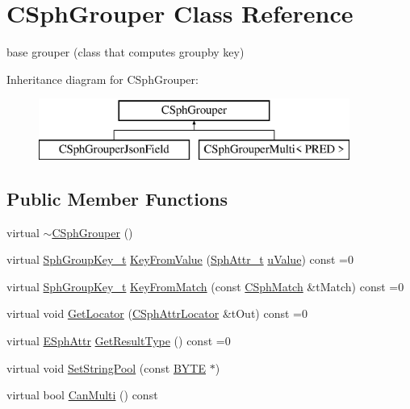 \hypertarget{classCSphGrouper}{\section{C\-Sph\-Grouper Class Reference}
\label{classCSphGrouper}
}


base grouper (class that computes groupby key)  


Inheritance diagram for C\-Sph\-Grouper\-:\begin{figure}[H]
\begin{center}
\leavevmode
\includegraphics[height=2.000000cm]{classCSphGrouper}
\end{center}
\end{figure}
\subsection*{Public Member Functions}
\begin{DoxyCompactItemize}
\item 
virtual \hyperlink{classCSphGrouper_a82d3b2cbbcfd56cc5fcca0156b30013a}{$\sim$\-C\-Sph\-Grouper} ()
\item 
virtual \hyperlink{sphinxsort_8cpp_ab18dbc744a7e1518a776845191f194c8}{Sph\-Group\-Key\-\_\-t} \hyperlink{classCSphGrouper_a1368b3aab58f2f0701dac5e0ffb7e4fb}{Key\-From\-Value} (\hyperlink{sphinx_8h_a7c122d91b0b52a0214ba176636bb1561}{Sph\-Attr\-\_\-t} \hyperlink{sphinxsort_8cpp_a7906295a5b0753053dbc737117036d06}{u\-Value}) const =0
\item 
virtual \hyperlink{sphinxsort_8cpp_ab18dbc744a7e1518a776845191f194c8}{Sph\-Group\-Key\-\_\-t} \hyperlink{classCSphGrouper_a4e4e035c9a8e19eeef0e930ec489fe5f}{Key\-From\-Match} (const \hyperlink{classCSphMatch}{C\-Sph\-Match} \&t\-Match) const =0
\item 
virtual void \hyperlink{classCSphGrouper_a1f44c7fcc468e8be0f8ff0f459f7df55}{Get\-Locator} (\hyperlink{structCSphAttrLocator}{C\-Sph\-Attr\-Locator} \&t\-Out) const =0
\item 
virtual \hyperlink{sphinxexpr_8h_aa883df0db2e4468a107fdd2d2ae625a3}{E\-Sph\-Attr} \hyperlink{classCSphGrouper_a65601058a482a9c00612190c3b0ce916}{Get\-Result\-Type} () const =0
\item 
virtual void \hyperlink{classCSphGrouper_ab963d24e91267e114176b78fc32b788e}{Set\-String\-Pool} (const \hyperlink{sphinxstd_8h_a4ae1dab0fb4b072a66584546209e7d58}{B\-Y\-T\-E} $\ast$)
\item 
virtual bool \hyperlink{classCSphGrouper_aec39875f0506599e9df0093af539d76d}{Can\-Multi} () const 
\end{DoxyCompactItemize}


